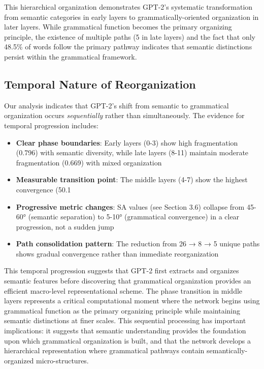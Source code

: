 This hierarchical organization demonstrates GPT-2's systematic transformation from semantic categories in early layers to grammatically-oriented organization in later layers. While grammatical function becomes the primary organizing principle, the existence of multiple paths (5 in late layers) and the fact that only 48.5\% of words follow the primary pathway indicates that semantic distinctions persist within the grammatical framework.

\subsection{Temporal Nature of Reorganization}

Our analysis indicates that GPT-2's shift from semantic to grammatical organization occurs \textit{sequentially} rather than simultaneously. The evidence for temporal progression includes:

\begin{itemize}
    \item \textbf{Clear phase boundaries}: Early layers (0-3) show high fragmentation (0.796) with semantic diversity, while late layers (8-11) maintain moderate fragmentation (0.669) with mixed organization
    \item \textbf{Measurable transition point}: The middle layers (4-7) show the highest convergence (50.1%
    \item \textbf{Progressive metric changes}: SA values (see Section 3.6) collapse from 45-60° (semantic separation) to 5-10° (grammatical convergence) in a clear progression, not a sudden jump
    \item \textbf{Path consolidation pattern}: The reduction from 26 → 8 → 5 unique paths shows gradual convergence rather than immediate reorganization
\end{itemize}

This temporal progression suggests that GPT-2 first extracts and organizes semantic features before discovering that grammatical organization provides an efficient macro-level representational scheme. The phase transition in middle layers represents a critical computational moment where the network begins using grammatical function as the primary organizing principle while maintaining semantic distinctions at finer scales. This sequential processing has important implications: it suggests that semantic understanding provides the foundation upon which grammatical organization is built, and that the network develops a hierarchical representation where grammatical pathways contain semantically-organized micro-structures.

